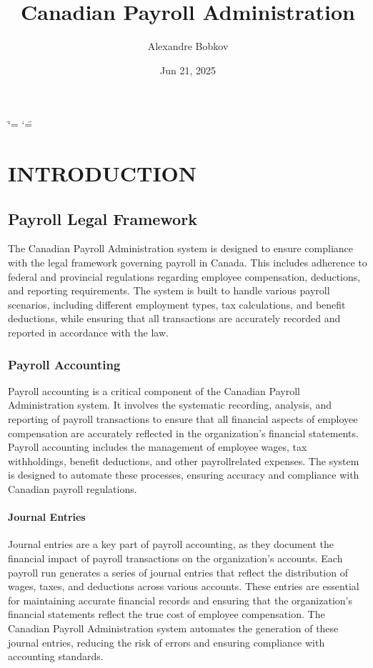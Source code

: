 \documentclass[letterpaper,10pt,english]{sphinxmanual}
\title{Canadian Payroll Administration}
\date{Jun 21, 2025}
\author{Alexandre Bobkov}
\begin{document}
\ifdefined\shorthandoff
  \ifnum\catcode`\=\string=\active\shorthandoff{=}\fi
  \ifnum\catcode`\"=\active{}\fi
\fi

\pagestyle{empty}
\sphinxmaketitle
\pagestyle{plain}
\sphinxtableofcontents
\pagestyle{normal}
\label{\detokenize{index::doc}}


\sphinxstepscope


\chapter{INTRODUCTION}
\label{\detokenize{introduction:introduction}}\label{\detokenize{introduction::doc}}

\section{Payroll Legal Framework}
\label{\detokenize{introduction:payroll-legal-framework}}
\sphinxAtStartPar
The Canadian Payroll Administration system is designed to ensure compliance with the legal framework governing payroll in Canada. This includes adherence to federal and provincial regulations regarding employee compensation, deductions, and reporting requirements.
The system is built to handle various payroll scenarios, including different employment types, tax calculations, and benefit deductions, while ensuring that all transactions are accurately recorded and reported in accordance with the law.


\subsection{Payroll Accounting}
\label{\detokenize{introduction:payroll-accounting}}
\sphinxAtStartPar
Payroll accounting is a critical component of the Canadian Payroll Administration system. It involves the systematic recording, analysis, and reporting of payroll transactions to ensure that all financial aspects of employee compensation are accurately reflected in the organization’s financial statements.
Payroll accounting includes the management of employee wages, tax withholdings, benefit deductions, and other payroll\sphinxhyphen{}related expenses. The system is designed to automate these processes, ensuring accuracy and compliance with Canadian payroll regulations.


\subsubsection{Journal Entries}
\label{\detokenize{introduction:journal-entries}}
\sphinxAtStartPar
Journal entries are a key part of payroll accounting, as they document the financial impact of payroll transactions on the organization’s accounts. Each payroll run generates a series of journal entries that reflect the distribution of wages, taxes, and deductions across various accounts.
These entries are essential for maintaining accurate financial records and ensuring that the organization’s financial statements reflect the true cost of employee compensation. The Canadian Payroll Administration system automates the generation of these journal entries, reducing the risk of errors and ensuring compliance with accounting standards.
\end{document}
